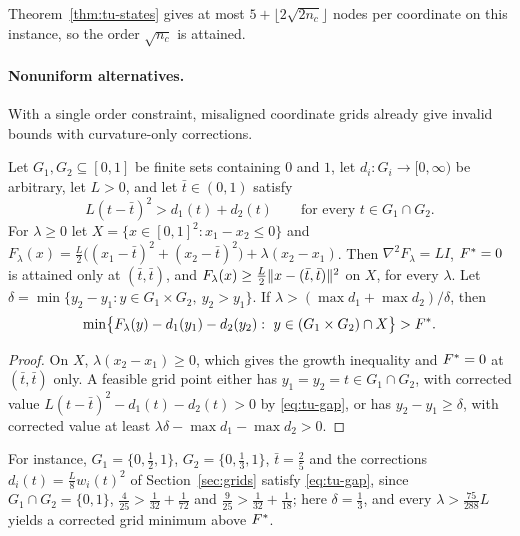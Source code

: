 Theorem~\ref{thm:tu-states} gives at most $5+\lfloor2\sqrt{2n_c}\rfloor$ nodes
per coordinate on this instance, so the order $\sqrt{n_c}$ is attained.

\paragraph{Nonuniform alternatives.} With a single order constraint,
misaligned coordinate grids already give invalid bounds with curvature-only
corrections.

\begin{proposition}\label{prop:tu-misaligned}
Let $G_1,G_2\subseteq[0,1]$ be finite sets containing $0$ and $1$, let
$d_i:G_i\to[0,\infty)$ be arbitrary, let $L>0$, and let $\bar t\in(0,1)$
satisfy
\begin{equation}\label{eq:tu-gap}
L(t-\bar t)^2>d_1(t)+d_2(t)\qquad\text{for every }t\in G_1\cap G_2 .
\end{equation}
For $\lambda\ge0$ let $X=\{x\in[0,1]^2:x_1-x_2\le0\}$ and
$F_\lambda(x)=\frac L2\bigl((x_1-\bar t)^2+(x_2-\bar t)^2\bigr)+\lambda(x_2-x_1)$.
Then $\nabla^2F_\lambda=LI$, $F^{*}=0$ is attained only at $(\bar t,\bar t)$,
and $F_\lambda(x)\ge\frac L2\lVert x-(\bar t,\bar t)\rVert^2$ on $X$, for every
$\lambda$. Let $\delta=\min\{y_2-y_1:y\in G_1\times G_2,\ y_2>y_1\}$. If
$\lambda>(\max d_1+\max d_2)/\delta$, then
\[
\min\bigl\{F_\lambda(y)-d_1(y_1)-d_2(y_2):\ y\in(G_1\times G_2)\cap X\bigr\}>\OPT .
\]
\end{proposition}

\begin{proof}
On $X$, $\lambda(x_2-x_1)\ge0$, which gives the growth inequality and
$F^{*}=0$ at $(\bar t,\bar t)$ only. A feasible grid point either has
$y_1=y_2=t\in G_1\cap G_2$, with corrected value
$L(t-\bar t)^2-d_1(t)-d_2(t)>0$ by \eqref{eq:tu-gap}, or has
$y_2-y_1\ge\delta$, with corrected value at least
$\lambda\delta-\max d_1-\max d_2>0$.
\end{proof}

For instance, $G_1=\{0,\frac12,1\}$, $G_2=\{0,\frac13,1\}$, $\bar t=\frac25$
and the corrections $d_i(t)=\frac L8w_i(t)^2$ of Section~\ref{sec:grids}
satisfy \eqref{eq:tu-gap}, since $G_1\cap G_2=\{0,1\}$,
$\frac4{25}>\frac1{32}+\frac1{72}$ and $\frac9{25}>\frac1{32}+\frac1{18}$; here
$\delta=\frac13$, and every $\lambda>\frac{75}{288}L$ yields a corrected grid
minimum above $F^{*}$.

